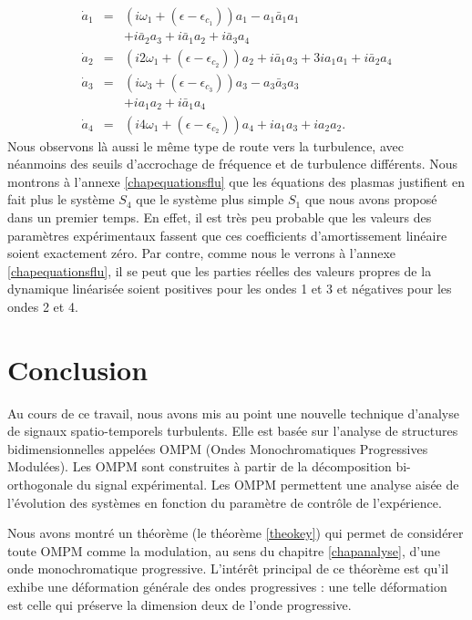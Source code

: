 \documentclass{book}
\begin{document}
\begin{eqnarray}
\dot{a}_1&=&(i\omega_1+(\epsilon-\epsilon_{c_1}))a_1-a_1\bar{a}_1a_1\nonumber\\
&&+i\bar{a}_2{a}_3+i\bar{a}_1a_2+i\bar{a}_3a_4\\
\dot{a}_2&=&(i2\omega_1+(\epsilon-\epsilon_{c_2}))a_2+i\bar{a}_1{a}_3+3ia_1a_1+i\bar{a}_2a_4\\
\dot{a}_3&=&(i\omega_3+(\epsilon-\epsilon_{c_3}))a_3-a_3\bar{a}_3a_3\nonumber\\
&&+ia_1a_2+i\bar{a}_1a_4\\
\dot{a}_4&=&(i4\omega_1+(\epsilon-\epsilon_{c_2}))a_4+ia_1a_3+ia_2a_2.
\end{eqnarray}
Nous observons l\`a aussi le m\^eme type de route vers la turbulence, avec
n\'eanmoins des seuils d'accrochage de fr\'equence et de turbulence
diff\'erents.
Nous montrons \`a l'annexe \ref{chapequationsflu} que les \'equations
des plasmas justifient en fait plus le syst\`eme $S_4$ que le syst\`eme
plus simple $S_1$ que nous avons propos\'e dans un premier temps. En
effet, il 
est tr\`es peu probable que les valeurs des param\`etres exp\'erimentaux
fassent 
que ces coefficients d'amortissement lin\'eaire soient exactement z\'ero.
Par contre, comme nous le verrons \`a l'annexe \ref{chapequationsflu},
il se peut 
que les parties r\'eelles des valeurs propres de
la dynamique lin\'earis\'ee soient 
positives pour les ondes 1 et 3 et n\'egatives pour les ondes 2 et 4.






\chapter*{Conclusion}

Au cours de ce travail, nous avons mis au point une nouvelle technique
d'analyse de signaux spatio-temporels turbulents. Elle est bas\'ee sur
l'analyse de 
structures bidimensionnelles appel\'ees OMPM (Ondes Monochromatiques
Progressives Modul\'ees). Les OMPM sont construites \`a partir
de la d\'ecomposition bi-orthogonale du signal exp\'erimental.
Les OMPM permettent une analyse ais\'ee de l'\'evolution des
syst\`emes en fonction du param\`etre de contr\^ole de l'exp\'erience.

Nous avons montr\'e un th\'eor\`eme (le th\'eor\`eme \ref{theokey})
qui permet de consid\'erer toute OMPM comme la modulation, au sens du
chapitre \ref{chapanalyse}, d'une onde monochromatique progressive.
L'int\'er\^et principal de ce th\'eor\`eme est qu'il exhibe une
d\'eformation 
g\'en\'erale des ondes progressives : une telle d\'eformation est
celle qui pr\'eserve la dimension deux de l'onde progressive.
\end{document}
